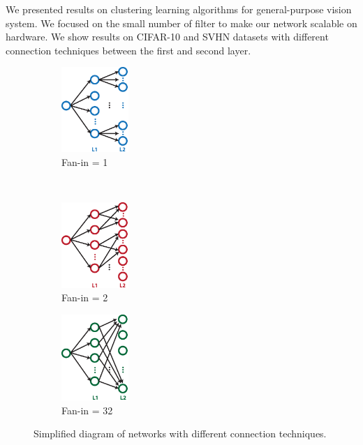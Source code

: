 \documentclass{article} %
\begin{document}
We presented results on clustering learning algorithms for general-purpose vision system. We focused on the small number of filter to make our network scalable on hardware. We show results on CIFAR-10 and SVHN datasets with different connection techniques between the first and second layer. 

\begin{figure}
        \centering
         \label{fig-secondconnex}
        \begin{subfigure}[b]{0.3\textwidth}
                \centering
                \includegraphics[width=1.0in]{fig-diagram-fanin1.eps}
                \caption{Fan-in = 1}
        \end{subfigure}%
        ~%
          \begin{subfigure}[b]{0.3\textwidth}
                \centering
                \includegraphics[width=1.0in]{fig-diagram-fanin2.eps}
                \caption{Fan-in = 2}
        \end{subfigure}%
        \begin{subfigure}[b]{0.3\textwidth}
                \centering
                \includegraphics[width=1.0in]{fig-diagram-faninall.eps}
                \caption{Fan-in = 32}
        \end{subfigure}
        \caption{Simplified diagram of networks with different connection techniques.}
\end{figure}
\end{document}
